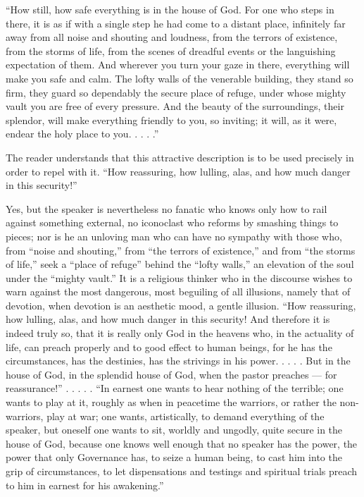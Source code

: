 \documentclass[12pt,a4paper]{article}
\newcommand{\opage}[1]{\marginnote{\footnotesize\textit{[#1]}}}
\begin{document}
``How still, how safe everything is in the house of God. For one who
steps in there, it is as if with a single step he had come to a distant
place, infinitely far away from all noise and shouting and loudness,
from the terrors of existence, from the storms of life, from the scenes
of dreadful events or the languishing expectation of them. And wherever
you turn your gaze in there, everything will make you safe and calm.
The lofty walls of the venerable building, they stand so firm, they
guard so dependably the secure place of refuge, under whose mighty
vault you are free of every pressure. And the beauty of the
surroundings, their splendor, will make everything friendly to you, so
inviting; it will, as it were, endear the holy place to you. . . . .''

The reader understands that this attractive description is to be used
precisely in order to repel with it. ``How reassuring, how lulling,
alas, and how much danger in this security!''

Yes, but the speaker is nevertheless no fanatic who knows only how to
rail against something external, no iconoclast who reforms by smashing
things to pieces; nor is
\opage{13}he an unloving man who can have no sympathy with those who, from
``noise and shouting,'' from ``the terrors of existence,'' and from
``the storms of life,'' seek a ``place of refuge'' behind the ``lofty
walls,'' an elevation of the soul under the ``mighty vault.'' It is a
religious thinker who in the discourse wishes to warn against the most
dangerous, most beguiling of all illusions, namely that of devotion,
when devotion is an aesthetic mood, a gentle illusion. ``How
reassuring, how lulling, alas, and how much danger in this security!
And therefore it is indeed truly so, that it is really only God in the
heavens who, in the actuality of life, can preach properly and to good
effect to human beings, for he has the circumstances, has the destinies,
has the strivings in his power. . . . . But in the house of God,
in the splendid house of God, when the pastor preaches ---
for reassurance!'' . . . . . ``In earnest one wants to hear nothing of
the terrible; one wants to play at it, roughly as when in peacetime the
warriors, or rather the non-warriors, play at war; one wants,
artistically, to demand everything of the speaker, but oneself one
wants to sit, worldly and ungodly, quite secure in the house of God,
because one knows well enough that no speaker has the power, the power
that only Governance has, to seize a human being, to cast him into the
grip of circumstances, to let dispensations and testings and spiritual
trials preach to him in earnest for his awakening.''
\end{document}
